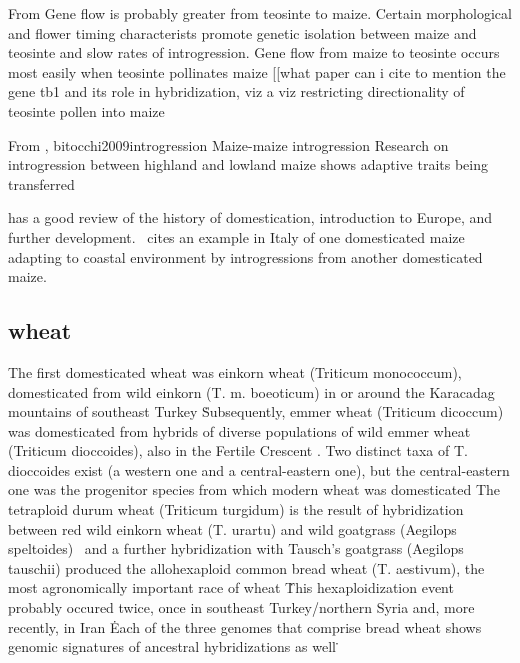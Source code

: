 \documentclass[11pt]{article}
\begin{document}
From \cite{baltazar2005pollination}
Gene flow is probably greater from teosinte to maize.
Certain morphological and flower timing characterists promote genetic isolation between maize and teosinte and slow rates of introgression.
Gene flow from maize to teosinte occurs most easily when teosinte pollinates maize
[[what paper can i cite to mention the gene tb1 and its role in hybridization, viz a viz restricting directionality of teosinte pollen into maize

From \cite{jiang1999genetic}, {bitocchi2009introgression}
Maize-maize introgression
Research on introgression between highland and lowland maize shows adaptive traits being transferred

\cite{bitocchi2009introgression} has a good review of the history of domestication, introduction to Europe, and further development.
\cite{hammer1987collection}\ cites an example in Italy of one domesticated maize adapting to coastal environment by introgressions from another domesticated maize.

\subsection*{wheat}

The first domesticated wheat was einkorn wheat (Triticum monococcum), domesticated from wild einkorn (T. m. boeoticum) in or around the Karacadag mountains of southeast Turkey \cite{heun1997site, harlan1966distribution, ozkan2002aflp}\.
Subsequently, emmer wheat (Triticum dicoccum) was domesticated from hybrids of diverse populations of wild emmer wheat (Triticum dioccoides), also in the Fertile Crescent \cite{lev2000cradle, civavn2013reticulated, luo2007structure, ozkan2002aflp}.
Two distinct taxa of T. dioccoides exist (a western one and a central-eastern one), but the central-eastern one was the progenitor species from which modern wheat was domesticated \cite{ozkan2005reconsideration}
The tetraploid durum wheat (Triticum turgidum) is the result of hybridization between red wild einkorn wheat (T. urartu) and wild goatgrass (Aegilops speltoides) \cite{mcfadden1946origin, petersen2006phylogenetic}\, and a further hybridization with Tausch's goatgrass (Aegilops tauschii) produced the allohexaploid common bread wheat (T. aestivum), the most agronomically important race of wheat \cite{salamini2002genetics, hancock2012plant, dvorak2006molecular}\.
This hexaploidization event probably occured twice, once in southeast Turkey/northern Syria and, more recently, in Iran \cite{giles2006gludy}\.
Each of the three genomes that comprise bread wheat shows genomic signatures of ancestral hybridizations as well \cite{marcussen2014ancient}\.
\end{document}
